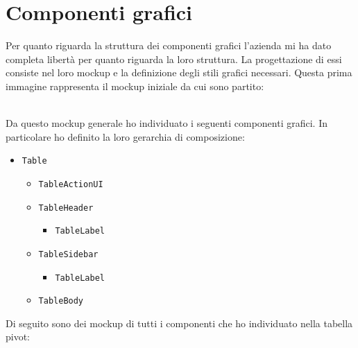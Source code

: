 \section{Componenti grafici}
Per quanto riguarda la struttura dei componenti grafici l'azienda mi ha dato completa libertà per quanto riguarda la loro struttura. La progettazione di essi consiste nel loro mockup e la definizione degli stili grafici necessari. Questa prima immagine rappresenta il mockup iniziale da cui sono partito: \\
\begin{minipage}{\linewidth}
\end{minipage}
\mbox{} \\
Da questo mockup generale ho individuato i seguenti componenti grafici. In particolare ho definito la loro gerarchia di composizione:
\begin{itemize}
	\item \verb|Table|
	\begin{itemize}
		\item \verb|TableActionUI|
		\item \verb|TableHeader|
		\begin{itemize}
			\item \verb|TableLabel|
		\end{itemize}
		\item \verb|TableSidebar|
		\begin{itemize}
			\item \verb|TableLabel|
		\end{itemize}
		\item \verb|TableBody|
	\end{itemize}
\end{itemize}

Di seguito sono dei mockup di tutti i componenti che ho individuato nella tabella pivot: \\

